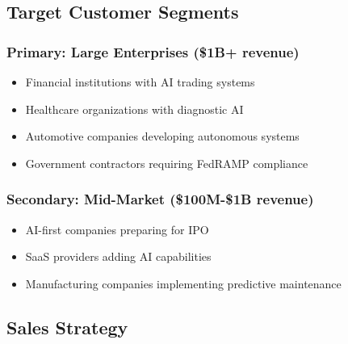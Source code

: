 \documentclass[12pt,a4paper]{article}
\begin{document}
\subsection{Target Customer Segments}

\subsubsection{Primary: Large Enterprises (\$1B+ revenue)}
\begin{itemize}
    \item Financial institutions with AI trading systems
    \item Healthcare organizations with diagnostic AI
    \item Automotive companies developing autonomous systems
    \item Government contractors requiring FedRAMP compliance
\end{itemize}

\subsubsection{Secondary: Mid-Market (\$100M-\$1B revenue)}
\begin{itemize}
    \item AI-first companies preparing for IPO
    \item SaaS providers adding AI capabilities
    \item Manufacturing companies implementing predictive maintenance
\end{itemize}

\subsection{Sales Strategy}

\begin{center}
\end{center}
\end{document}
